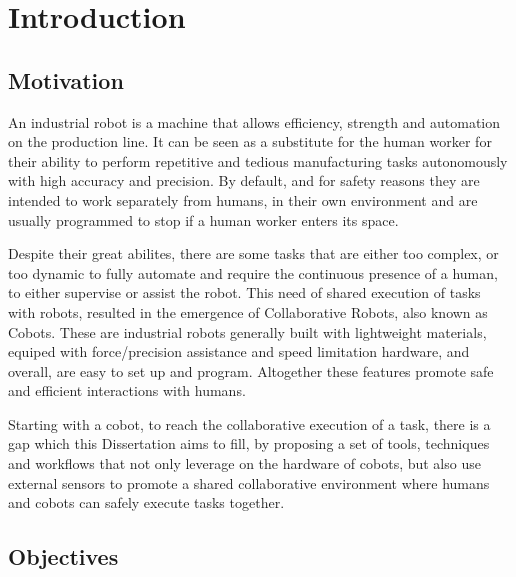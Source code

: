 \chapter{Introduction}
\label{chapter:introduction}





\section{Motivation}

\par An industrial robot is a machine that allows efficiency, strength and automation on the production line. It can be seen as a substitute for the human worker for their ability to perform repetitive and tedious manufacturing tasks autonomously with high accuracy and precision. By default, and for safety reasons they are intended to work separately from humans, in their own environment and are usually programmed to stop if a human worker enters its space.

\par Despite their great abilites, there are some tasks that are either too complex, or too dynamic to fully automate and require the continuous presence of a human, to either supervise or assist the robot. This need of shared execution of tasks with robots, resulted in the emergence of Collaborative Robots, also known as Cobots. These are industrial robots generally built with lightweight materials, equiped with force/precision assistance and speed limitation hardware, and overall, are easy to set up and program. Altogether these features promote safe and efficient interactions with humans.

\par Starting with a cobot, to reach the collaborative execution of a task, there is a gap which this Dissertation aims to fill, by proposing a set of tools, techniques and workflows that not only leverage on the hardware of cobots, but also use external sensors to promote a shared collaborative environment where humans and cobots can safely execute tasks together.


\section{Objectives}

